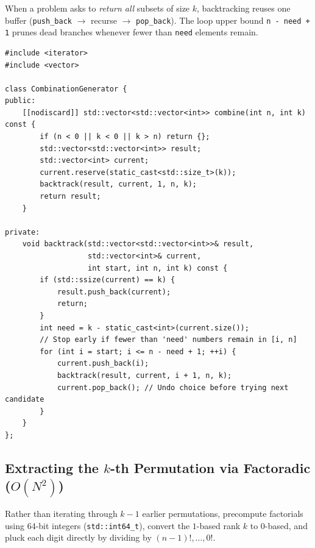 \documentclass[11pt,a4paper]{article}
\theoremstyle{definition}
\begin{document}
When a problem asks to \emph{return all} subsets of size $k$, backtracking reuses one buffer (\texttt{push\_back} $\to$ recurse $\to$ \texttt{pop\_back}). The loop upper bound \texttt{n - need + 1} prunes dead branches whenever fewer than \texttt{need} elements remain.

\begin{lstlisting}[caption={Backtracking All k-Combinations of 1..n with Remaining-Count Pruning}]
#include <iterator>
#include <vector>

class CombinationGenerator {
public:
    [[nodiscard]] std::vector<std::vector<int>> combine(int n, int k) const {
        if (n < 0 || k < 0 || k > n) return {};
        std::vector<std::vector<int>> result;
        std::vector<int> current;
        current.reserve(static_cast<std::size_t>(k));
        backtrack(result, current, 1, n, k);
        return result;
    }

private:
    void backtrack(std::vector<std::vector<int>>& result,
                   std::vector<int>& current,
                   int start, int n, int k) const {
        if (std::ssize(current) == k) {
            result.push_back(current);
            return;
        }
        int need = k - static_cast<int>(current.size());
        // Stop early if fewer than 'need' numbers remain in [i, n]
        for (int i = start; i <= n - need + 1; ++i) {
            current.push_back(i);
            backtrack(result, current, i + 1, n, k);
            current.pop_back(); // Undo choice before trying next candidate
        }
    }
};
\end{lstlisting}

\subsection{Extracting the $k$-th Permutation via Factoradic ($O(N^2)$)}

Rather than iterating through $k - 1$ earlier permutations, precompute factorials using 64-bit integers (\texttt{std::int64\_t}), convert the $1$-based rank $k$ to $0$-based, and pluck each digit directly by dividing by $(n - 1)!, \dots, 0!$.
\end{document}
